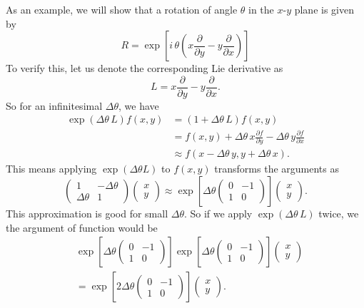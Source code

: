 \documentclass{article}
\begin{document}
As an example,
we will show that
a rotation of angle $\theta$
in the $x$-$y$ plane is given by
$$
R = \exp\left[i \, \theta \left(x \frac{\partial}{\partial y} - y \frac{\partial }{\partial x} \right) \right]
$$
To verify this, let us denote the corresponding Lie derivative as
$$
L = x \frac{\partial}{\partial y} - y \frac{\partial }{\partial x}.
$$
So for an infinitesimal $\Delta \theta$, we have
$$
\begin{aligned}
\exp( \Delta \theta \, L) f(x, y)
&= (1 + \Delta \theta \, L) f(x, y) \\
&= f(x, y) + \Delta \theta \, x \frac{ \partial f } { \partial y }
- \Delta \theta \, y \frac{ \partial f } { \partial x }
\\
&\approx f(x - \Delta \theta \, y, y + \Delta \theta \, x).
\end{aligned}
$$
This means applying $\exp(\Delta \theta L)$
to $f(x, y)$ transforms the arguments as
$$
\left(
  \begin{array}{ccc}
    1 & -\Delta \theta \\
    \Delta \theta & 1
  \end{array}
\right)
\left(
  \begin{array}{ccc}
    x \\
    y
  \end{array}
\right)
\approx
\exp\left[\Delta \theta \left(
  \begin{array}{ccc}
    0 & -1 \\
    1 & 0
  \end{array}
\right)
\right]
\left(
  \begin{array}{ccc}
    x \\
    y
  \end{array}
\right).
$$
This approximation is good for small $\Delta \theta$.
%
So if we apply $\exp(\Delta \theta \, L)$ twice,
we the argument of function would be
$$
\begin{aligned}
&
\exp\left[
  \Delta \theta
\left(
  \begin{array}{ccc}
    0 & -1 \\
    1 & 0
  \end{array}
\right)\right]
\exp\left[
  \Delta \theta
\left(
  \begin{array}{ccc}
    0 & -1 \\
    1 & 0
  \end{array}
\right)\right]
\left(
  \begin{array}{ccc}
    x \\
    y
  \end{array}
\right)
\\
&=
\exp\left[
  2\Delta \theta
\left(
  \begin{array}{ccc}
    0 & -1 \\
    1 & 0
  \end{array}
\right)\right]
\left(
  \begin{array}{ccc}
    x \\
    y
  \end{array}
\right).
\end{aligned}
$$
\end{document}
